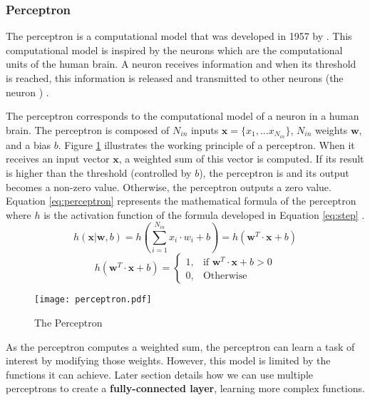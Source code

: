 \subsubsection{Perceptron} \label{subs:perceptron}
The perceptron is a computational model that was developed in 1957 by \textcite{rosenblatt_perceptron_1958}. This computational model is inspired by the neurons which are the computational units of the human brain. A neuron receives information and when its threshold is reached, this information is released and transmitted to other neurons (the neuron ) \cite{rosenblatt_perceptron_1958, matteucci_artificial_2019}.

The perceptron corresponds to the computational model of a neuron in a human brain. The perceptron is composed of $N_{in}$ inputs $\boldsymbol{x} = \{ x_1, ... x_{N_{in}} \}$, $N_{in}$ weights $\boldsymbol{w}$, and a bias $b$. Figure \ref{fig:perceptron} illustrates the working principle of a perceptron. When it receives an input vector $\boldsymbol{x}$, a weighted sum of this vector is computed. If its result is higher than the threshold (controlled by $b$), the perceptron is  and its output becomes a non-zero value. Otherwise, the perceptron outputs a zero value.
Equation \eqref{eq:perceptron} represents the mathematical formula of the perceptron where $h$ is the activation function of the formula developed in Equation \eqref{eq:step} \cite{matteucci_artificial_2019}.
%
\begin{equation}
    h ( \boldsymbol{x} | \boldsymbol{w}, b) = h \left( \sum^{N_{in}}_{i=1} x_i \cdot w_i + b \right) = h \left( \boldsymbol{w}^{T} \cdot \boldsymbol{x} + b \right)
    \label{eq:perceptron}
\end{equation}
%
\begin{equation}
    h ( \boldsymbol{w}^{T} \cdot \boldsymbol{x} + b) = \begin{cases} 1, & \mbox{if } \boldsymbol{w}^{T} \cdot \boldsymbol{x} + b > 0 \\ 0, & \mbox{Otherwise} \end{cases}
    \label{eq:step}
\end{equation}
%
\begin{figure}[H]
    \centering
    \texttt{[image: perceptron.pdf]}
    \caption{The Perceptron}
    \label{fig:perceptron}
\end{figure}
%
As the perceptron computes a weighted sum, the perceptron can learn a task of interest by modifying those weights. However, this model is limited by the functions it can achieve. Later section details how we can use multiple perceptrons to create a \textbf{fully-connected layer}, learning more complex functions.
